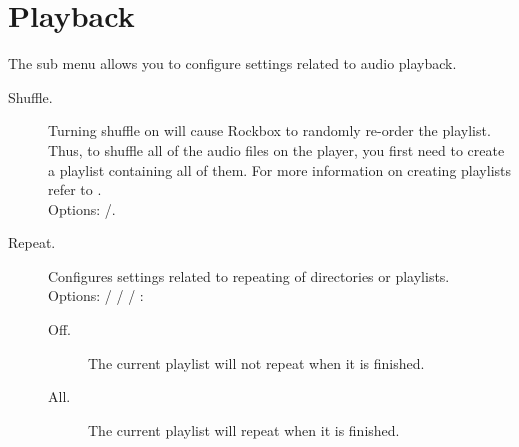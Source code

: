 \section{\label{ref:PlaybackOptions}Playback}
The  sub menu allows you to configure settings
related to audio playback.
\begin{description}
\item[Shuffle. ]Turning shuffle on will cause Rockbox to randomly re-order the
  playlist. Thus, to shuffle all of the audio files on the player, you first
  need to create a playlist containing all of them. For more information on
  creating playlists refer to .\\
  Options: /.
\item[Repeat. ]Configures settings related to repeating of directories or
  playlists.\\
  Options:  /  /  / 
  :
  \begin{description}
  \item[Off. ]The current playlist will not repeat when it is finished.
  \item[All. ]The current playlist will repeat when it is finished.


\end{description}
\end{description}
